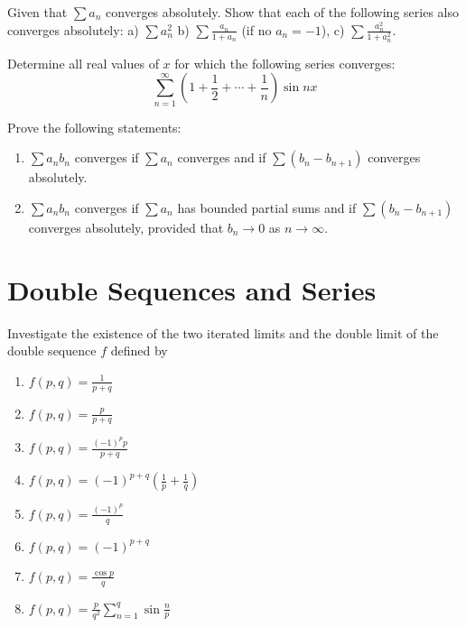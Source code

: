 \begin{problembox}
Given that \(\sum a_n\) converges absolutely. Show that each of the following series also converges absolutely:
a) \(\sum a_n^2\) b) \(\sum \frac{a_n}{1 + a_n}\) (if no \(a_n = -1\)),
c) \(\sum \frac{a_n^2}{1 + a_n^2}\).
\end{problembox}



\begin{problembox}
Determine all real values of \(x\) for which the following series converges:
\[\sum_{n=1}^{\infty} \left( 1 + \frac{1}{2} + \cdots + \frac{1}{n} \right) \sin nx\]
\end{problembox}



\begin{problembox}
Prove the following statements:
\begin{enumerate}[label=\alph*)]
\item \(\sum a_n b_n\) converges if \(\sum a_n\) converges and if \(\sum (b_n - b_{n+1})\) converges absolutely.
\item \(\sum a_n b_n\) converges if \(\sum a_n\) has bounded partial sums and if \(\sum (b_n - b_{n+1})\) converges absolutely, provided that \(b_n \to 0\) as \(n \to \infty\).
\end{enumerate}
\end{problembox}

\section{Double Sequences and Series}



\begin{problembox}
Investigate the existence of the two iterated limits and the double limit of the double sequence \(f\) defined by
\begin{enumerate}[label=\alph*)]
\item \( f(p, q) = \frac{1}{p + q}\)
\item \( f(p, q) = \frac{p}{p + q}\)
\item \( f(p, q) = \frac{(-1)^p p}{p + q}\)
\item \( f(p, q) = (-1)^{p+q} \left( \frac{1}{p} + \frac{1}{q} \right)\)
\item \( f(p, q) = \frac{(-1)^p}{q}\)
\item \( f(p, q) = (-1)^{p+q}\)
\item \( f(p, q) = \frac{\cos p}{q}\)
\item \( f(p, q) = \frac{p}{q^2} \sum_{n=1}^{q} \sin \frac{n}{p}\)
\end{enumerate}
\end{problembox}



